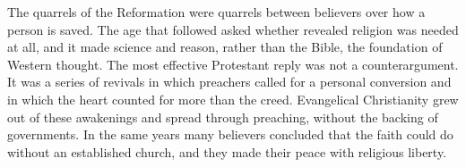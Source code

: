 \begin{partoverview}
The quarrels of the Reformation were quarrels between believers over how a person is saved. The age
that followed asked whether revealed religion was needed at all, and it made science and reason, rather
than the Bible, the foundation of Western thought. The most effective Protestant reply was not a
counterargument. It was a series of revivals in which preachers called for a personal conversion and in
which the heart counted for more than the creed. Evangelical Christianity grew out of these awakenings
and spread through preaching, without the backing of governments. In the same years many believers
concluded that the faith could do without an established church, and they made their peace with
religious liberty.
\end{partoverview}
